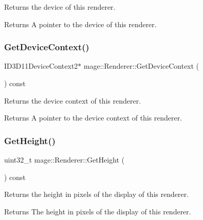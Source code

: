 Returns the device of this renderer.

\begin{DoxyReturn}{Returns}
A pointer to the device of this renderer. 
\end{DoxyReturn}
\hypertarget{classmage_1_1_renderer_a13df5f31b3d18d2f4428743ebd7ffbe5}{}\label{classmage_1_1_renderer_a13df5f31b3d18d2f4428743ebd7ffbe5} 
\subsubsection{\texorpdfstring{Get\+Device\+Context()}{GetDeviceContext()}}
{\footnotesize\ttfamily I\+D3\+D11\+Device\+Context2$\ast$ mage\+::\+Renderer\+::\+Get\+Device\+Context (\begin{DoxyParamCaption}{ }\end{DoxyParamCaption}) const\hspace{0.3cm}{\ttfamily [noexcept]}}

Returns the device context of this renderer.

\begin{DoxyReturn}{Returns}
A pointer to the device context of this renderer. 
\end{DoxyReturn}
\hypertarget{classmage_1_1_renderer_adc6940516d809d1916c627d6ce3837fe}{}\label{classmage_1_1_renderer_adc6940516d809d1916c627d6ce3837fe} 
\subsubsection{\texorpdfstring{Get\+Height()}{GetHeight()}}
{\footnotesize\ttfamily uint32\+\_\+t mage\+::\+Renderer\+::\+Get\+Height (\begin{DoxyParamCaption}{ }\end{DoxyParamCaption}) const\hspace{0.3cm}{\ttfamily [noexcept]}}

Returns the height in pixels of the display of this renderer.

\begin{DoxyReturn}{Returns}
The height in pixels of the display of this renderer. 
\end{DoxyReturn}
\hypertarget{classmage_1_1_renderer_a6f19510d91cb5dd71c41fde26db9aeaa}{}\label{classmage_1_1_renderer_a6f19510d91cb5dd71c41fde26db9aeaa} 

